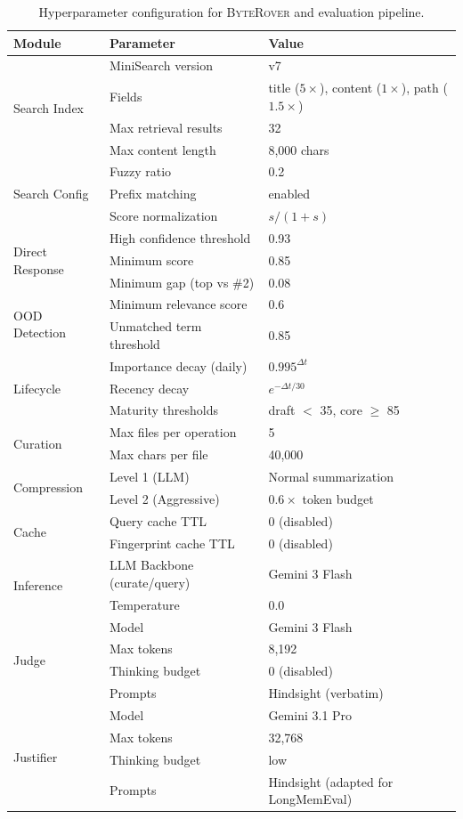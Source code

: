 \documentclass[11pt]{article}
\newcommand{\byterover}{\textsc{ByteRover}}
\begin{document}
\begin{table}[h]
\centering
\small
\begin{tabular}{@{}lll@{}}
\toprule
\textbf{Module} & \textbf{Parameter} & \textbf{Value} \\
\midrule
\multirow{4}{*}{Search Index} & MiniSearch version & v7 \\
 & Fields & title ($5\times$), content ($1\times$), path ($1.5\times$) \\
 & Max retrieval results & 32 \\
 & Max content length & 8{,}000 chars \\
\midrule
\multirow{3}{*}{Search Config} & Fuzzy ratio & 0.2 \\
 & Prefix matching & enabled \\
 & Score normalization & $s / (1 + s)$ \\
\midrule
\multirow{3}{*}{Direct Response} & High confidence threshold & 0.93 \\
 & Minimum score & 0.85 \\
 & Minimum gap (top vs \#2) & 0.08 \\
\midrule
\multirow{2}{*}{OOD Detection} & Minimum relevance score & 0.6 \\
 & Unmatched term threshold & 0.85 \\
\midrule
\multirow{3}{*}{Lifecycle} & Importance decay (daily) & $0.995^{\Delta t}$ \\
 & Recency decay & $e^{-\Delta t / 30}$ \\
 & Maturity thresholds & draft $<$ 35, core $\geq$ 85 \\
\midrule
\multirow{2}{*}{Curation} & Max files per operation & 5 \\
 & Max chars per file & 40,000 \\
\midrule
\multirow{2}{*}{Compression} & Level 1 (LLM) & Normal summarization \\
 & Level 2 (Aggressive) & $0.6\times$ token budget \\
\midrule
\multirow{2}{*}{Cache} & Query cache TTL & 0 (disabled) \\
 & Fingerprint cache TTL & 0 (disabled) \\
\midrule
\multirow{2}{*}{Inference} & LLM Backbone (curate/query) & Gemini 3 Flash \\
 & Temperature & 0.0 \\
\midrule
\multirow{4}{*}{Judge} & Model & Gemini 3 Flash \\
 & Max tokens & 8{,}192 \\
 & Thinking budget & 0 (disabled) \\
 & Prompts & Hindsight (verbatim) \\
\midrule
\multirow{4}{*}{Justifier} & Model & Gemini 3.1 Pro \\
 & Max tokens & 32{,}768 \\
 & Thinking budget & low \\
 & Prompts & Hindsight (adapted for LongMemEval) \\
\bottomrule
\end{tabular}
\caption{Hyperparameter configuration for \byterover{} and evaluation pipeline.}
\label{tab:hyperparameters}
\end{table}
\end{document}
